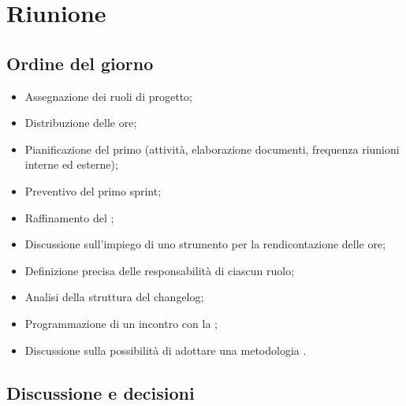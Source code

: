 \section{Riunione}
\subsection{Ordine del giorno}
\begin{itemize}
	\item Assegnazione dei ruoli di progetto;
	\item Distribuzione delle ore;
	\item Pianificazione del primo  (attività, elaborazione documenti, frequenza riunioni interne ed esterne);
	\item Preventivo del primo sprint;
	\item Raffinamento del \glossario{\WoW};
	\item Discussione sull'impiego di uno strumento per la rendicontazione delle ore;
	\item Definizione precisa delle responsabilità di ciascun ruolo;
	\item Analisi della struttura del changelog;
	\item Programmazione di un incontro con la ;
	\item Discussione sulla possibilità di adottare una metodologia .
\end{itemize}

\subsection{Discussione e decisioni}

